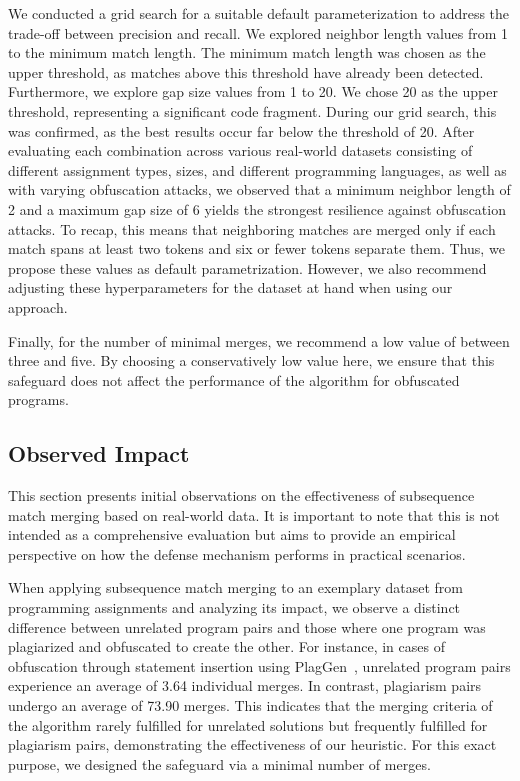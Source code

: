 We conducted a grid search for a suitable default parameterization to address the trade-off between precision and recall.
We explored neighbor length values from 1 to the minimum match length. The minimum match length was chosen as the upper threshold, as matches above this threshold have already been detected. Furthermore, we explore gap size values from 1 to 20. We chose 20 as the upper threshold, representing a significant code fragment. During our grid search, this was confirmed, as the best results occur far below the threshold of 20. After evaluating each combination across various real-world datasets consisting of different assignment types, sizes, and different programming languages, as well as with varying obfuscation attacks, we observed that a minimum neighbor length of 2 and a maximum gap size of 6 yields the strongest resilience against obfuscation attacks.
To recap, this means that neighboring matches are merged only if each match spans at least two tokens and six or fewer tokens separate them.
Thus, we propose these values as default parametrization. However, we also recommend adjusting these hyperparameters for the dataset at hand when using our approach.

Finally, for the number of minimal merges, we recommend a low value of between three and five. By choosing a conservatively low value here, we ensure that this safeguard does not affect the performance of the algorithm for obfuscated programs.

\subsection{Observed Impact}\label{sec:smm-impact}
This section presents initial observations on the effectiveness of subsequence match merging based on real-world data. It is important to note that this is not intended as a comprehensive evaluation but aims to provide an empirical perspective on how the defense mechanism performs in practical scenarios.

When applying subsequence match merging to an exemplary dataset from programming assignments and analyzing its impact, we observe a distinct difference between unrelated program pairs and those where one program was plagiarized and obfuscated to create the other. For instance, in cases of obfuscation through statement insertion using PlagGen~\cite{Broedel2023}, unrelated program pairs experience an average of 3.64 individual merges. In contrast, plagiarism pairs undergo an average of 73.90 merges. This indicates that the merging criteria of the algorithm rarely fulfilled for unrelated solutions but frequently fulfilled for plagiarism pairs, demonstrating the effectiveness of our heuristic. For this exact purpose, we designed the safeguard via a minimal number of merges. 

